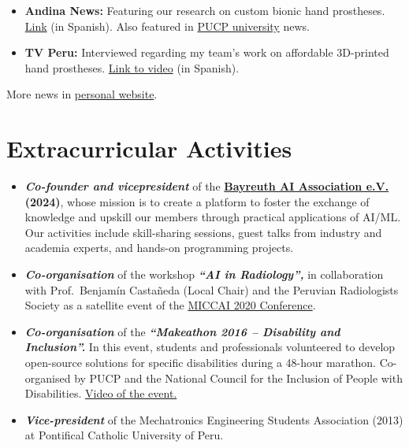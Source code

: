 \documentclass[a4paper,10pt]{article}
\begin{document}
\begin{itemize}
  \item \textbf{Andina News:} Featuring our research on custom bionic hand prostheses.
        \href{https://andina.pe/agencia/noticia-investigadores-fabrican-protesis-mioelectrica-personalizada-mano-832760.aspx}{Link}
        (in Spanish). Also featured in
        \href{https://puntoedu.pucp.edu.pe/noticia/manos-inteligentes/}{PUCP university} news.

  \item \textbf{TV Peru:} Interviewed regarding my team's work on affordable 3D-printed hand
        prostheses.
        \href{https://www.youtube.com/watch?v=WlIK1LMIvh8&t=13s}{Link to video} (in Spanish).
\end{itemize}

More news in \href{https://renatomio.github.io/news/}{personal website}.

\section{Extracurricular Activities}

\begin{itemize}
  \item \textbf{\textit{Co-founder and vicepresident}} of the
        \textbf{\href{https://www.ai-association.uni-bayreuth.de/en/index.html}{Bayreuth AI Association e.V.}
        (2024)}, whose mission is to create a platform to foster the exchange of knowledge and
        upskill our members through practical applications of AI/ML. Our activities include
        skill-sharing sessions, guest talks from industry and academia experts, and hands-on
        programming projects.

  \item \textbf{\textit{Co-organisation}} of the workshop \textbf{\textit{``AI in Radiology'',}}
        in collaboration with Prof.\ Benjam\'in Casta\~neda (Local Chair) and the Peruvian
        Radiologists Society as a satellite event of the
        \href{https://www.miccai2020.org/en/}{MICCAI 2020 Conference}.

  \item \textbf{\textit{Co-organisation}} of the \textbf{\textit{``Makeathon 2016 -- Disability
        and Inclusion''.}} In this event, students and professionals volunteered to develop
        open-source solutions for specific disabilities during a 48-hour marathon. Co-organised by
        PUCP and the National Council for the Inclusion of People with Disabilities.
        \href{https://www.youtube.com/watch?v=YoldwjsR4V8}{Video of the event.}

  \item \textbf{\textit{Vice-president}} of the Mechatronics Engineering Students Association
        (2013) at Pontifical Catholic University of Peru.
\end{itemize}
\end{document}
